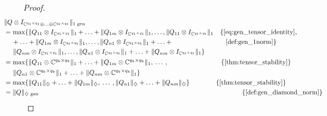 \begin{proof}
  \begin{align*}
    & \hspace{-30pt} \lVert Q \otimes I_{\mathbb{C}^{q_1 \times q_1} \oplus \ldots \oplus \mathbb{C}^{q_t \times q_t}} \rVert_{1 \text{ gen}} \\
    & \hspace{-30pt}  = \max \{ \lVert Q_{11}  \otimes I_{\mathbb{C}^{q_1 \times q_1}}  \rVert_{1}  + \ldots +  \lVert Q_{1m}  \otimes I_{\mathbb{C}^{q_1 \times q_1}} \rVert_{1},  \ldots ,  \lVert Q_{11} \otimes I_{\mathbb{C}^{q_t \times q_t}} \rVert_{1}   \quad \{\text{\autoref{eq:gen_tensor_identity}, } \\
    & \hspace{-18pt}  + \ldots + \lVert Q_{1m} \otimes I_{\mathbb{C}^{q_t \times q_t}} \rVert_{1}, \ldots,  \lVert Q_{n1}  \otimes I_{\mathbb{C}^{q_1 \times q_1}}  \rVert_{1} + \ldots +  \hspace{80 pt} \text{\autoref{def:gen_1norm}} \} \\
    & \hspace{-16pt}\lVert Q_{nm}  \otimes I_{\mathbb{C}^{q_1 \times q_1}} \rVert_{1}, \ldots,  \lVert Q_{n1} \otimes I_{\mathbb{C}^{q_t \times q_t}} \rVert_{1} + \ldots + \lVert Q_{nm} \otimes I_{\mathbb{C}^{q_t \times q_t}} \rVert_{1} \} \\
    &  \hspace{-30pt}  = \max \{ \|Q_{11} \otimes \mathbb{C}^{q_k \times q_k}\|_{1} + \ldots + \|Q_{1m} \otimes \mathbb{C}^{q_k \times q_k}\|_{1}, \hspace{2pt} \ldots \hspace{2pt} , \hspace {80 pt}  \{ \text{\autoref{thm:tensor_stability}}\}\\
    & \hspace{-16pt} \|Q_{n1} \otimes \mathbb{C}^{q_k \times q_k}\|_{1} + \ldots + \|Q_{nm} \otimes \mathbb{C}^{q_k \times q_k}\|_{1} \} \\
    &  \hspace{-30pt} = \max \{\|Q_{11}\|_{\diamondsuit} + \ldots + \|Q_{1m}\|_{\diamondsuit}, \hspace{2pt} \ldots \hspace{2pt}, \|Q_{n1}\|_{\diamondsuit} + \ldots + \|Q_{nm}\|_{\diamondsuit} \} \hspace{40pt}\{ \text{\autoref{thm:tensor_stability}}\} \\
    & \hspace{-30pt}  = \lVert Q \rVert_{\diamondsuit \text{ gen}}  \hspace{308 pt}  \{ \text{\autoref{def:gen_diamond_norm}}\}
  \end{align*} 
\end{proof}

